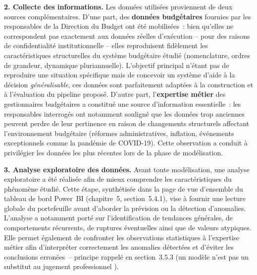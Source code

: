 \medskip

\noindent\textbf{2. Collecte des informations.} Les donn\'ees utilis\'ees
proviennent de deux sources compl\'ementaires. D'une part, des
\textbf{donn\'ees budg\'etaires} fournies par les responsables de la Direction du
Budget ont \'et\'e mobilis\'ees~: bien qu'elles ne correspondent pas exactement
aux donn\'ees r\'eelles d'ex\'ecution -- pour des raisons de confidentialit\'e
institutionnelle -- elles reproduisent fid\`element les caract\'eristiques
structurelles du syst\`eme budg\'etaire \'etudi\'e (nomenclature, ordres de
grandeur, dynamique pluriannuelle). L'objectif principal n'\'etant pas de
reproduire une situation sp\'ecifique mais de concevoir un syst\`eme d'aide \`a
la d\'ecision \emph{g\'en\'eralisable}, ces donn\'ees sont parfaitement
adapt\'ees \`a la construction et \`a l'\'evaluation du pipeline propos\'e.
D'autre part, l'\textbf{expertise m\'etier} des gestionnaires budg\'etaires a
constitu\'e une source d'information essentielle~: les responsables
interrog\'es ont notamment soulign\'e que les donn\'ees trop anciennes peuvent
perdre de leur pertinence en raison de changements structurels affectant
l'environnement budg\'etaire (r\'eformes administratives, inflation,
\'ev\'enements exceptionnels comme la pand\'emie de COVID-19). Cette
observation a conduit \`a privil\'egier les donn\'ees les plus r\'ecentes lors
de la phase de mod\'elisation.

\medskip

\noindent\textbf{3. Analyse exploratoire des donn\'ees.} Avant toute
mod\'elisation, une analyse exploratoire a \'et\'e r\'ealis\'ee afin de mieux
comprendre les caract\'eristiques du ph\'enom\`ene \'etudi\'e. Cette \'etape,
synth\'etis\'ee dans la page de vue d'ensemble du tableau de bord Power~BI
(chapitre~5, section~5.4.1), vise \`a fournir une lecture globale du portefeuille
avant d'aborder la pr\'evision ou la d\'etection d'anomalies. L'analyse a
notamment port\'e sur l'identification de tendances g\'en\'erales, de
comportements r\'ecurrents, de ruptures \'eventuelles ainsi que de valeurs
atypiques. Elle permet \'egalement de confronter les observations statistiques
\`a l'expertise m\'etier afin d'interpr\'eter correctement les anomalies
d\'etect\'ees et d'\'eviter les conclusions erron\'ees~-- principe rappel\'e en
section~3.5.3 (\og un mod\`ele n'est pas un substitut au jugement professionnel \fg{}).

\medskip

